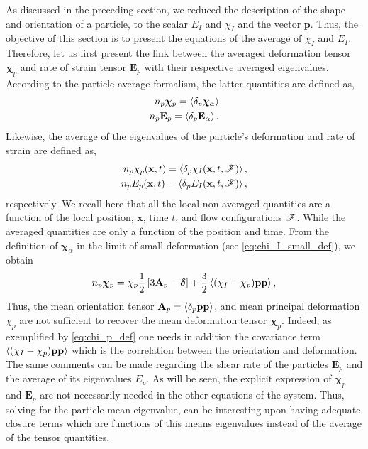 As discussed in the preceding section, we reduced the description of the shape and orientation of a particle, to the scalar $E_I$ and $\chi_I$ and the vector $\textbf{p}$. 
Thus, the objective of this section is to present the equations of the average of $\chi_I$ and $E_I$. 
Therefore, let us first present the link between the averaged deformation tensor $\bm\chi_p$ and rate of strain tensor $\textbf{E}_p$ with their respective averaged eigenvalues.
According to the particle average formalism, the latter quantities are defined as,
\begin{align*}
    n_p \bm\chi_p = \left<\delta_p \bm\chi_\alpha\right>\\
    n_p \textbf{E}_p = \left<\delta_p \textbf{E}_\alpha\right>.
\end{align*}
Likewise, the average of the eigenvalues of the particle's deformation and rate of strain are defined as, 
\begin{align*}
    n_p \chi_p(\textbf{x},t) = \left<\delta_p \chi_I(\textbf{x},t,\mathscr{F})\right>,\\
    n_p E_p(\textbf{x},t) = \left<\delta_p E_I(\textbf{x},t,\mathscr{F})\right>,
\end{align*}
respectively. 
We recall here that all the local non-averaged quantities are a function of the local position, $\textbf{x}$, time $t$, and flow configurations $\mathscr{F}$. 
While the averaged quantities are only a function of the position and time. 
From the definition of $\bm\chi_\alpha$ in the limit of small  deformation (see \ref{eq:chi_I_small_def}), we obtain
\begin{equation}
    n_p \bm\chi_p
    = \chi_p
    \frac{1}{2}\left[
        3\textbf{A}_p 
        - \bm\delta
    \right]
    + \frac{3}{2}\avg{(\chi_I - \chi_p) \textbf{pp} }, 
    \label{eq:chi_p_def}
\end{equation}
Thus, the mean orientation tensor $\textbf{A}_p = \left<\delta_p \textbf{pp}\right>$, and mean principal deformation $\chi_p$ are not sufficient to recover the mean deformation tensor $\bm\chi_p$.
Indeed, as exemplified by \ref{eq:chi_p_def} one needs in addition the covariance term $\left<(\chi_I - \chi_p) \textbf{pp} \right>$ which is the correlation between the orientation and deformation. 
The same comments can be made regarding the shear rate of the particles $\textbf{E}_p$ and the average of its eigenvalues $E_p$. 
As will be seen, the explicit expression of $\bm\chi_p$ and $\textbf{E}_p$ are not necessarily needed in the other equations of the system. 
Thus, solving for the particle mean eigenvalue, can be interesting upon having adequate closure terms which are functions of this means eigenvalues instead of the average of the tensor quantities.


